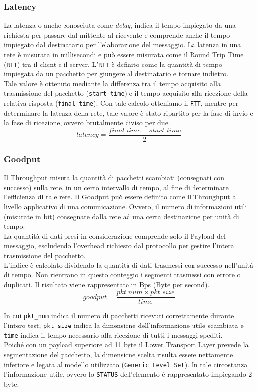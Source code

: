 \subsubsection{Latency}
La latenza o anche conosciuta come \textit{delay}, indica il tempo impiegato da una richiesta per passare dal mittente al ricevente e comprende anche il tempo impiegato dal destinatario per l'elaborazione del messaggio. La latenza in una rete è misurata in millisecondi e può essere misurata come il Round Trip Time (\texttt{RTT}) tra il client e il server. L'\texttt{RTT} è definito come la quantità di tempo impiegata da un pacchetto per giungere al destinatario e tornare indietro.\\
Tale valore è ottenuto mediante la differenza tra il tempo acquisito alla trasmissione del pacchetto (\texttt{start\_time}) e il tempo acquisito alla ricezione della relativa risposta (\texttt{final\_time}). Con tale calcolo otteniamo il \texttt{RTT}, mentre per determinare la latenza della rete, tale valore è stato ripartito per la fase di invio e la fase di ricezione, ovvero brutalmente diviso per due.
$$ latency = \frac{final\_time - start\_time}{2} $$

\subsubsection{Goodput}
Il Throughput misura la quantità di pacchetti scambiati (consegnati con successo) sulla rete, in un certo intervallo di tempo, al fine di determinare l'efficienza di tale rete. Il Goodput può essere definito come il Throughput a livello applicativo di una comunicazione. Ovvero, il numero di informazioni utili (misurate in bit) consegnate dalla rete ad una certa destinazione per unità di tempo.\\
La quantità di dati presi in considerazione comprende solo il Payload del messaggio, escludendo l'overhead richiesto dal protocollo per gestire l'intera trasmissione del pacchetto.\\
L'indice è calcolato dividendo la quantità di dati trasmessi con successo nell'unità di tempo. Non rientrano in questo conteggio i segmenti trasmessi con errore o duplicati. Il risultato viene rappresentato in Bps (Byte per second).
$$ goodput = \frac{pkt\_num \times pkt\_size}{time} $$

\noindent In cui \texttt{pkt\_num} indica il numero di pacchetti ricevuti correttamente durante l'intero test, \texttt{pkt\_size} indica la dimensione dell'informazione utile scambiata e \texttt{time} indica il tempo necessario alla ricezione di tutti i messaggi spediti.\\
Poiché con un payload superiore ad 11 byte il Lower Transport Layer prevede la segmentazione del pacchetto, la dimensione scelta risulta essere nettamente inferiore e legata al modello utilizzato (\texttt{Generic Level Set}). In tale circostanza l'informazione utile, ovvero lo \texttt{STATUS} dell'elemento è rappresentato impiegando 2 byte.

